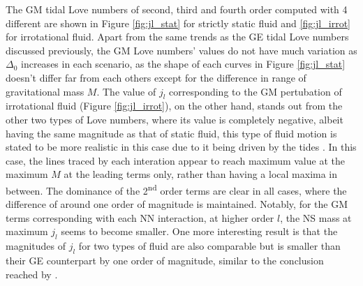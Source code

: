 The \gls{GM} tidal Love numbers of second, third and fourth order computed with 4 different  are shown in Figure \ref{fig:jl_stat} for strictly static fluid and \ref{fig:jl_irrot} for irrotational fluid. Apart from the same trends as the \gls{GE} tidal Love numbers discussed previously, the \gls{GM} Love numbers' values do not have much variation as $\Delta_0$ increases in each scenario, as the shape of each curves in Figure \ref{fig:jl_stat} doesn't differ far from each others except for the difference in range of gravitational mass $M$. The value of $j_l$ corresponding to the \gls{GM} pertubation of irrotational fluid (Figure \ref{fig:jl_irrot}), on the other hand, stands out from the other two types of Love numbers, where its value is completely negative, albeit having the same magnitude as that of static fluid, this type of fluid motion is stated to be more realistic in this case due to it being driven by the tides \citep{perot2021role,pani2018magnetic}. In this case, the lines traced by each interation appear to reach maximum value at the maximum $M$ at the leading terms only, rather than having a local maxima in between. The dominance of the 2\textsuperscript{nd} order terms are clear in all cases, where the difference of around one order of magnitude is maintained. Notably, for the \gls{GM} terms corresponding with each \gls{NN} interaction, at higher order $l$, the \gls{NS} mass at maximum $j_l$ seems to become smaller. One more interesting result is that the magnitudes of $j_l$ for two types of fluid are also comparable but is smaller than their \gls{GE} counterpart by one order of magnitude, similar to the conclusion reached by \cite{perot2021role}.
